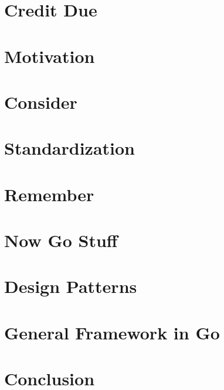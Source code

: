 \documentclass[hyperref]{beamer}
\title{\fontsize{25}{25}\selectfont{Project Structure}}
\subtitle{Idioms and suggestions from the Go community}
\author[McCurdy]{Colton J. McCurdy\\
{\small \href{https://twitter.com/McCurdyColton}{\textcolor{solarizedOrange}{\fontsize{15}{30}{\faTwitter\,}\small McCurdyColton}}}}
\institute[]{Detroit Go Meetup}
\date[]{November 19th, 2019}
\begin{document}
\begin{frame}
  \titlepage
\end{frame}

\section{Credit Due}


\section{Motivation}


\section{Consider}


\section{Standardization}


\section{Remember}


\section{Now Go Stuff}


\section{Design Patterns}


\section{General Framework in Go}


\section{Conclusion}

\end{document}
